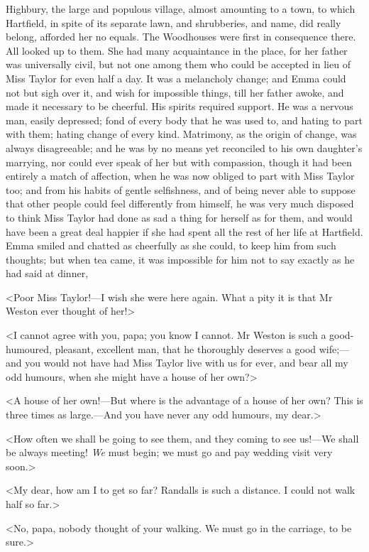 Highbury, the large and populous village, almost amounting to a town, to which Hartfield, in spite of its separate lawn, and shrubberies, and name, did really belong, afforded her no equals. The Woodhouses were first in consequence there. All looked up to them. She had many acquaintance in the place, for her father was universally civil, but not one among them who could be accepted in lieu of Miss Taylor for even half a day. It was a melancholy change; and Emma could not but sigh over it, and wish for impossible things, till her father awoke, and made it necessary to be cheerful. His spirits required support. He was a nervous man, easily depressed; fond of every body that he was used to, and hating to part with them; hating change of every kind. Matrimony, as the origin of change, was always disagreeable; and he was by no means yet reconciled to his own daughter's marrying, nor could ever speak of her but with compassion, though it had been entirely a match of affection, when he was now obliged to part with Miss Taylor too; and from his habits of gentle selfishness, and of being never able to suppose that other people could feel differently from himself, he was very much disposed to think Miss Taylor had done as sad a thing for herself as for them, and would have been a great deal happier if she had spent all the rest of her life at Hartfield. Emma smiled and chatted as cheerfully as she could, to keep him from such thoughts; but when tea came, it was impossible for him not to say exactly as he had said at dinner,

<Poor Miss Taylor!—I wish she were here again. What a pity it is that Mr Weston ever thought of her!>

<I cannot agree with you, papa; you know I cannot. Mr Weston is such a good-humoured, pleasant, excellent man, that he thoroughly deserves a good wife;—and you would not have had Miss Taylor live with us for ever, and bear all my odd humours, when she might have a house of her own?>

<A house of her own!—But where is the advantage of a house of her own? This is three times as large.—And you have never any odd humours, my dear.>

<How often we shall be going to see them, and they coming to see us!—We shall be always meeting! \textit{We} must begin; we must go and pay wedding visit very soon.>

<My dear, how am I to get so far? Randalls is such a distance. I could not walk half so far.>

<No, papa, nobody thought of your walking. We must go in the carriage, to be sure.>

